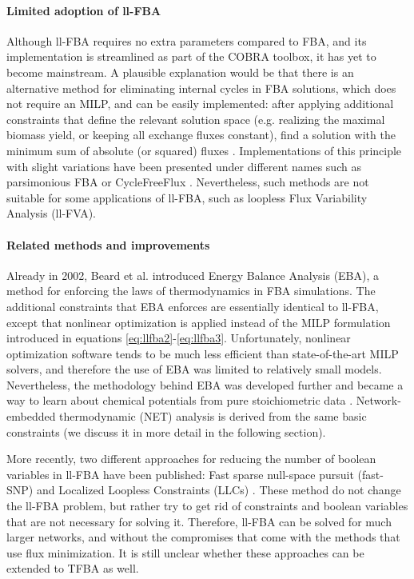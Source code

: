 \documentclass[twocolumn]{article}
\begin{document}
\paragraph{Limited adoption of ll-FBA} Although ll-FBA requires no extra parameters compared to FBA, and its implementation is streamlined as part of the COBRA toolbox, it has yet to become mainstream. A plausible explanation would be that there is an alternative method for eliminating internal cycles in FBA solutions, which does not require an MILP, and can be easily implemented: after applying additional constraints that  define the relevant solution space (e.g. realizing the maximal biomass yield, or keeping all exchange fluxes constant), find a solution with the minimum sum of absolute (or squared) fluxes \cite{Holzhutter2004-qj}. Implementations of this principle with slight variations have been presented under different names such as parsimonious FBA \cite{Lewis2010-rx, Schuetz2012-sv} or CycleFreeFlux \cite{Desouki2015-lh}. Nevertheless, such methods are not suitable for some applications of ll-FBA, such as loopless Flux Variability Analysis (ll-FVA).

\paragraph{Related methods and improvements}
Already in 2002, Beard et al. \cite{Beard2002-xt} introduced Energy Balance Analysis (EBA), a method for enforcing the laws of thermodynamics in FBA simulations. The additional constraints that EBA enforces are essentially identical to ll-FBA, except that nonlinear optimization is applied instead of the MILP formulation introduced in equations \ref{eq:llfba2}-\ref{eq:llfba3}. Unfortunately, nonlinear optimization software tends to be much less efficient than state-of-the-art MILP solvers, and therefore the use of EBA was limited to relatively small models. Nevertheless, the methodology behind EBA was developed further and became a way to learn about chemical potentials from pure stoichiometric data \cite{Beard2004, Warren2007-wm, Reznik2013}. Network-embedded thermodynamic (NET) analysis \cite{Kummel2006-px, Kummel2006-qn, Zamboni2008} is derived from the same basic constraints (we discuss it in more detail in the following section).

More recently, two different approaches for reducing the number of boolean variables in ll-FBA have been published: Fast sparse null-space pursuit (fast-SNP) \cite{Saa2016} and Localized Loopless Constraints (LLCs) \cite{Chan2017}. These method do not change the ll-FBA problem, but rather try to get rid of constraints and boolean variables that are not necessary for solving it. Therefore, ll-FBA can be solved for much larger networks, and without the compromises that come with the methods that use flux minimization. It is still unclear whether these approaches can be extended to TFBA as well.
\end{document}

